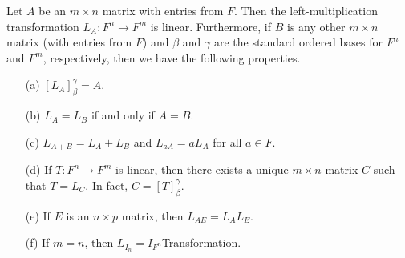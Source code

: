 \begin{theorem}\label{Prop of LMT}
   Let \( A  \) be an \( m \times n  \) matrix with entries from \( F  \). Then the left-multiplication transformation \( {L}_{A}: F^{n} \to F^{m}  \) is linear. Furthermore, if \( B  \) is any other \( m \times n  \) matrix (with entries from \( F  \)) and \( \beta \) and \( \gamma \) are the standard ordered bases for \( F^{n}  \) and \( F^{m}  \), respectively, then we have the following properties.
   \begin{enumerate}
       \item[(a)] \( [{L}_{A}]_{\beta}^{\gamma}  = A  \). 
        \item[(b)] \( {L}_{A} = {L}_{B} \) if and only if \( A = B  \).
        \item[(c)] \( {L}_{A + B } = {L}_{A } + {L}_{B} \) and \( {L}_{aA} = a {L}_{A} \) for all \( a \in F  \).
        \item[(d)] If \( T: F^{n} \to F^{m} \) is linear, then there exists a unique \( m \times n  \) matrix \( C  \) such that \( T = {L}_{C}  \). In fact, \( C = [T]_{\beta}^{\gamma}  \).
        \item[(e)] If \( E  \) is an \( n \times p  \) matrix, then \( {L}_{AE} = {L}_{A} {L}_{E} \).
        \item[(f)] If \( m = n  \), then \( {L}_{{I}_{n}} = {I}_{F^{n}}  \)Transformation.
   \end{enumerate}
\end{theorem}
